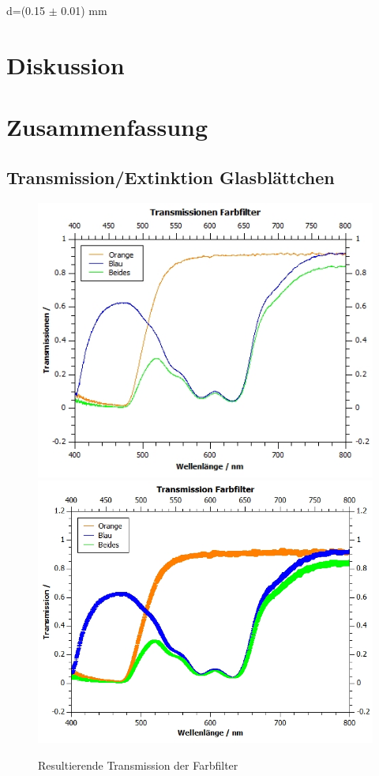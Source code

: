 \documentclass[12pt,a4paper,twoside]{article}
\begin{document}
\noindent
d=(0.15 $\pm$ 0.01) mm




\section{Diskussion} %


\section{Zusammenfassung} %

\subsection{Transmission/Extinktion Glasblättchen}

\begin{figure}[H]
    \centering
    \includegraphics[width=0.4\linewidth]{nudes/qti-Transmission-FarbfilterOU.jpg}
    \includegraphics[width=0.4\linewidth]{nudes/qti-Transmission-Farbfilter.jpg}
    \caption{Resultierende Transmission der Farbfilter}
    \label{fig:TransmissionFarbfilterAW}
\end{figure}
\end{document}
